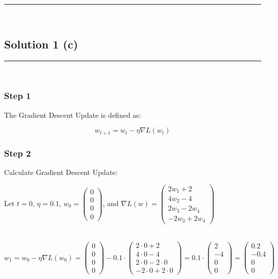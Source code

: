 \documentclass{article}
\begin{document}
\noindent\rule{\textwidth}{0.4pt}\\

\newpage

\subsection*{Solution 1 (c)}
\noindent\rule{\textwidth}{0.4pt}\\

\subsubsection*{Step 1}
\parbox{\textwidth}{
The Gradient Descent Update is defined as:
}
$$
w_{t+1} = w_t - \eta \nabla L(w_t)
$$
\subsubsection*{Step 2}
\parbox{\textwidth}{
Calculate Gradient Descent Update:
}
\parbox{\textwidth}{
Let $t=0$, $\eta = 0.1$, $w_0 =
\begin{pmatrix}
  0 \\
  0 \\
  0 \\
  0
\end{pmatrix}$, and $\nabla L(w) =
\begin{pmatrix}
  2w_1 + 2 \\
  4w_2 - 4 \\
  2w_3 - 2w_4 \\
  -2w_3 + 2w_4
\end{pmatrix}$
}\\

$$
w_{1} = w_0 - \eta \nabla L(w_0) = \begin{pmatrix} 0 \\ 0 \\ 0 \\ 0 \end{pmatrix} - 0.1 \cdot 
\begin{pmatrix}
2 \cdot 0 + 2 \\
4 \cdot 0 - 4 \\
2\cdot 0 - 2 \cdot 0 \\
-2 \cdot 0 + 2 \cdot 0
\end{pmatrix} =
0.1 \cdot
\begin{pmatrix}
2 \\
-4 \\
0 \\
0
\end{pmatrix} =
\begin{pmatrix}
0.2 \\
-0.4 \\
0 \\
0
\end{pmatrix}
$$
\end{document}

